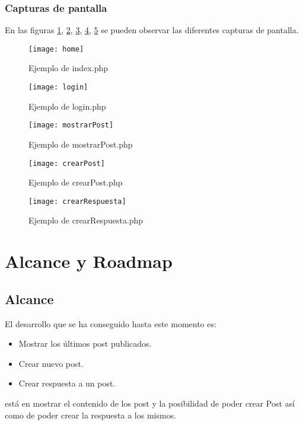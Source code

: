 \documentclass[a4paper]{article}
\begin{document}
	\subsubsection{Capturas de pantalla}
	En las figuras \ref{home.php}, \ref{login.php}, \ref{mostrarpost.php}, \ref{crearpost.php}, \ref{crearrespuesta.php} se pueden observar las diferentes capturas de pantalla.
	\begin{figure}[htb]
		\texttt{[image: home]}
		\caption{Ejemplo de index.php}
		\label{home.php}
	\end{figure}
	\begin{figure}[htb]
		\texttt{[image: login]}
		\caption{Ejemplo de login.php}
		\label{login.php}
	\end{figure}
	\begin{figure}[htb]
		\texttt{[image: mostrarPost]}
		\caption{Ejemplo de mostrarPost.php}
		\label{mostrarpost.php}
	\end{figure}
	\begin{figure}[htb]
		\texttt{[image: crearPost]}
		\caption{Ejemplo de crearPost.php}
		\label{crearpost.php}
	\end{figure}
	\begin{figure}[htb]
		\texttt{[image: crearRespuesta]}
		\caption{Ejemplo de crearRespuesta.php}
		\label{crearrespuesta.php}
	\end{figure}
	
	\section{Alcance y Roadmap}
	\subsection{Alcance}
	El desarrollo que se ha conseguido hasta este momento es:
	\begin{itemize}
		\item Mostrar los últimos post publicados.
		\item Crear nuevo post.
		\item Crear respuesta a un post.
	\end{itemize}
	está en mostrar el contenido de los post y la posibilidad de poder crear Post así como de poder crear la respuesta a los mismos.
\end{document}
